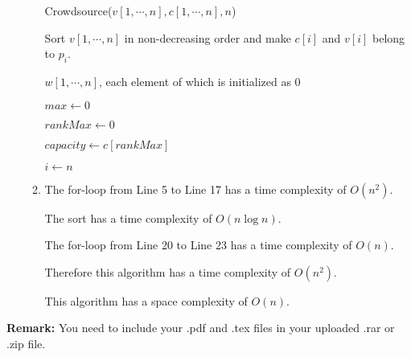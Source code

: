 \documentclass[12pt,a4paper]{article}
\theoremstyle{definition}
\begin{document}
\begin{enumerate}
\begin{enumerate}
    	    \begin{minipage}[t]{0.90\textwidth}
    	    	\begin{algorithm}[H]
    	    		\BlankLine
    	    		\caption{Crowdsource($v[1,\cdots,n],c[1,\cdots,n],n$)}
    	    		\label{Alg-Crowdsource}
    	    		
    	    		Sort $v[1,\cdots,n]$ in non-decreasing order and make $c[i]$ and $v[i]$ belong to $p_i$.
    	    	
    	    		$w[1,\cdots,n]$, each element of which is initialized as $0$\;
    	    		
    	    		$max\leftarrow 0$\;
    	    		
    	    		$rankMax\leftarrow 0$\;
    	    		
        	        $capacity\leftarrow c[rankMax]$\;
        	        
        	        $i\leftarrow n$\;
    	    		
    	    		\;
    	    		
    	    	\end{algorithm}
    	    \end{minipage} 
        \item 
            The for-loop from Line 5 to Line 17 has a time complexity of $O(n^2)$.
            
            The sort has a time complexity of $O(n\log n)$.
            
            The for-loop from Line 20 to Line 23 has a time complexity of $O(n)$.
            
            Therefore this algorithm has a time complexity of $O(n^2)$.
            
            This algorithm has a space complexity of $O(n)$.
        \end{enumerate}
\end{enumerate}

\vspace{20pt}

\textbf{Remark:} You need to include your .pdf and .tex files in your uploaded .rar or .zip file.

\end{document}
